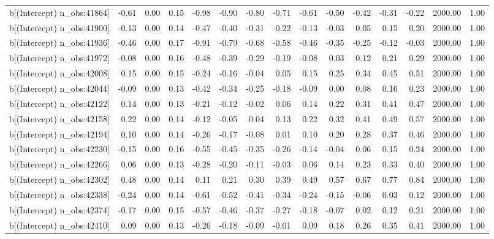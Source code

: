 \begin{table}[ht]
\begin{tabular}{rrrrrrrrrrrrrrr}
  b[(Intercept) n\_obs:41864] & -0.61 & 0.00 & 0.15 & -0.98 & -0.90 & -0.80 & -0.71 & -0.61 & -0.50 & -0.42 & -0.31 & -0.22 & 2000.00 & 1.00 \\ 
  b[(Intercept) n\_obs:41900] & -0.13 & 0.00 & 0.14 & -0.47 & -0.40 & -0.31 & -0.22 & -0.13 & -0.03 & 0.05 & 0.15 & 0.20 & 2000.00 & 1.00 \\ 
  b[(Intercept) n\_obs:41936] & -0.46 & 0.00 & 0.17 & -0.91 & -0.79 & -0.68 & -0.58 & -0.46 & -0.35 & -0.25 & -0.12 & -0.03 & 2000.00 & 1.00 \\ 
  b[(Intercept) n\_obs:41972] & -0.08 & 0.00 & 0.16 & -0.48 & -0.39 & -0.29 & -0.19 & -0.08 & 0.03 & 0.12 & 0.21 & 0.29 & 2000.00 & 1.00 \\ 
  b[(Intercept) n\_obs:42008] & 0.15 & 0.00 & 0.15 & -0.24 & -0.16 & -0.04 & 0.05 & 0.15 & 0.25 & 0.34 & 0.45 & 0.51 & 2000.00 & 1.00 \\ 
  b[(Intercept) n\_obs:42044] & -0.09 & 0.00 & 0.13 & -0.42 & -0.34 & -0.25 & -0.18 & -0.09 & 0.00 & 0.08 & 0.16 & 0.23 & 2000.00 & 1.00 \\ 
  b[(Intercept) n\_obs:42122] & 0.14 & 0.00 & 0.13 & -0.21 & -0.12 & -0.02 & 0.06 & 0.14 & 0.22 & 0.31 & 0.41 & 0.47 & 2000.00 & 1.00 \\ 
  b[(Intercept) n\_obs:42158] & 0.22 & 0.00 & 0.14 & -0.12 & -0.05 & 0.04 & 0.13 & 0.22 & 0.32 & 0.41 & 0.49 & 0.57 & 2000.00 & 1.00 \\ 
  b[(Intercept) n\_obs:42194] & 0.10 & 0.00 & 0.14 & -0.26 & -0.17 & -0.08 & 0.01 & 0.10 & 0.20 & 0.28 & 0.37 & 0.46 & 2000.00 & 1.00 \\ 
  b[(Intercept) n\_obs:42230] & -0.15 & 0.00 & 0.16 & -0.55 & -0.45 & -0.35 & -0.26 & -0.14 & -0.04 & 0.06 & 0.15 & 0.24 & 2000.00 & 1.00 \\ 
  b[(Intercept) n\_obs:42266] & 0.06 & 0.00 & 0.13 & -0.28 & -0.20 & -0.11 & -0.03 & 0.06 & 0.14 & 0.23 & 0.33 & 0.40 & 2000.00 & 1.00 \\ 
  b[(Intercept) n\_obs:42302] & 0.48 & 0.00 & 0.14 & 0.11 & 0.21 & 0.30 & 0.39 & 0.49 & 0.57 & 0.67 & 0.77 & 0.84 & 2000.00 & 1.00 \\ 
  b[(Intercept) n\_obs:42338] & -0.24 & 0.00 & 0.14 & -0.61 & -0.52 & -0.41 & -0.34 & -0.24 & -0.15 & -0.06 & 0.03 & 0.12 & 2000.00 & 1.00 \\ 
  b[(Intercept) n\_obs:42374] & -0.17 & 0.00 & 0.15 & -0.57 & -0.46 & -0.37 & -0.27 & -0.18 & -0.07 & 0.02 & 0.12 & 0.21 & 2000.00 & 1.00 \\ 
  b[(Intercept) n\_obs:42410] & 0.09 & 0.00 & 0.13 & -0.26 & -0.18 & -0.09 & -0.01 & 0.09 & 0.18 & 0.26 & 0.35 & 0.41 & 2000.00 & 1.00 \\ 

\end{tabular}
\end{table}
